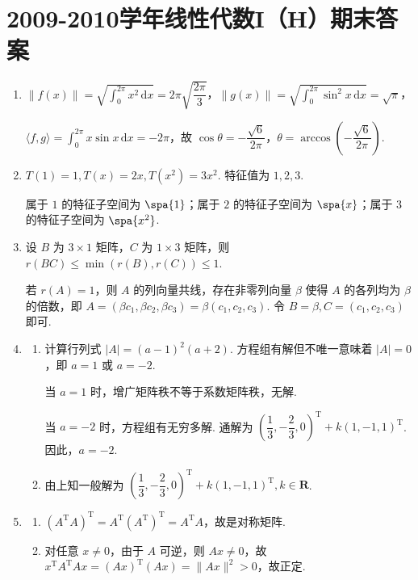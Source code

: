 \section{2009-2010学年线性代数I（H）期末答案}

\begin{enumerate}
    \item $\|f(x)\|=\sqrt{\displaystyle\int_0^{2\pi} x^2 \, \mathrm{d}x}=2\pi\sqrt{\dfrac{2\pi}{3}}$，$\|g(x)\|=\sqrt{\displaystyle\int_0^{2\pi} \sin^2 x \,\mathrm{d}x}=\sqrt{\pi}$，

    $\langle f,g \rangle = \displaystyle\int_0^{2\pi} x \sin x \,\mathrm{d}x = -2\pi$，故 $\cos\theta = -\dfrac{\sqrt{6}}{2\pi}$，$\theta = \arccos\left(-\dfrac{\sqrt{6}}{2\pi}\right)$.

    \item $T(1)=1, T(x)=2x, T(x^2)=3x^2$. 特征值为 $1, 2, 3$.

    属于 $1$ 的特征子空间为 $\spa\{1\}$；属于 $2$ 的特征子空间为 $\spa\{x\}$；属于 $3$ 的特征子空间为 $\spa\{x^2\}$.

    \item 设 $B$ 为 $3\times 1$ 矩阵，$C$ 为 $1\times 3$ 矩阵，则 $r(BC) \leqslant \min(r(B), r(C)) \leqslant 1$.

    若 $r(A)=1$，则 $A$ 的列向量共线，存在非零列向量 $\beta$ 使得 $A$ 的各列均为 $\beta$ 的倍数，即 $A = (\beta c_1, \beta c_2, \beta c_3) = \beta (c_1, c_2, c_3)$. 令 $B=\beta, C=(c_1, c_2, c_3)$ 即可.

    \item \begin{enumerate}
        \item 计算行列式 $|A| = (a-1)^2(a+2)$. 方程组有解但不唯一意味着 $|A|=0$，即 $a=1$ 或 $a=-2$.

        当 $a=1$ 时，增广矩阵秩不等于系数矩阵秩，无解.

        当 $a=-2$ 时，方程组有无穷多解. 通解为 $(\dfrac{1}{3}, -\dfrac{2}{3}, 0)^\mathrm{T} + k(1, -1, 1)^\mathrm{T}$. 因此，$a=-2$.

        \item 由上知一般解为 $(\dfrac{1}{3}, -\dfrac{2}{3}, 0)^\mathrm{T} + k(1, -1, 1)^\mathrm{T}, k \in \mathbf{R}$.
    \end{enumerate}

    \item
    \begin{enumerate}
        \item $(A^\mathrm{T}A)^\mathrm{T} = A^\mathrm{T}(A^\mathrm{T})^\mathrm{T} = A^\mathrm{T}A$，故是对称矩阵.
        \item 对任意 $x \neq 0$，由于 $A$ 可逆，则 $Ax \neq 0$，故 $x^\mathrm{T}A^\mathrm{T}Ax = (Ax)^\mathrm{T}(Ax) = \|Ax\|^2 > 0$，故正定.
    \end{enumerate}


\end{enumerate}
